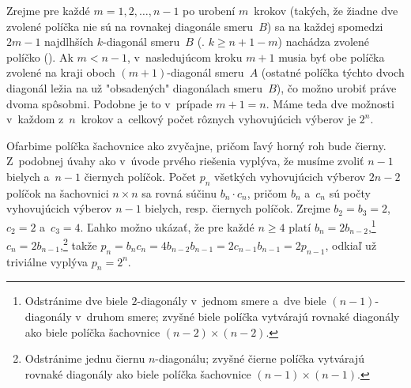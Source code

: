 {Zrejme pre každé $m=1,2,\dots,n-1$ po urobení $m$~krokov (takých, že žiadne dve zvolené políčka nie sú na rovnakej diagonále smeru~$B$) sa na každej spomedzi $2m-1$ najdlhších $k$-diagonál smeru~$B$ (\tj. $k\ge n+1-m$) nachádza zvolené políčko (\obr). Ak $m<n-1$, v~nasledujúcom kroku $m+1$ musia byť obe políčka zvolené na kraji oboch $(m+1)$-diagonál smeru~$A$ (ostatné políčka týchto dvoch diagonál ležia na už "obsadených" diagonálach smeru~$B$), čo možno urobiť práve dvoma spôsobmi. Podobne je to v~prípade $m+1=n$. Máme teda dve možnosti v~každom z~$n$~krokov a~celkový počet rôznych vyhovujúcich výberov je $2^n$.


\ineriesenie
{}
Ofarbime políčka šachovnice ako zvyčajne, pričom ľavý horný roh bude čierny. Z~podobnej úvahy ako v~úvode prvého riešenia vyplýva, že musíme zvoliť $n-1$ bielych a~$n-1$ čiernych políčok. Počet $p_n$ všetkých vyhovujúcich výberov $2n-2$ políčok na šachovnici $n\times n$ sa rovná súčinu $b_n\cdot c_n$, pričom $b_n$ a~$c_n$ sú počty vyhovujúcich výberov $n-1$ bielych, resp. čiernych políčok. Zrejme $b_2=b_3=2$, $c_2=2$ a~$c_3=4$. Ľahko možno ukázať, že pre každé $n\ge4$ platí $b_n=2b_{n-2}$,\footnote{Odstránime dve biele $2$-diagonály v~jednom smere a~dve biele $(n-1)$-diagonály v~druhom smere; zvyšné biele políčka vytvárajú rovnaké diagonály ako biele políčka šachovnice $(n-2)\times(n-2)$.} $c_n=2b_{n-1}$,\footnote{Odstránime jednu čiernu $n$-diagonálu; zvyšné čierne políčka vytvárajú rovnaké diagonály ako biele políčka šachovnice $(n-1)\times(n-1)$.} takže $p_n=b_nc_n=4b_{n-2}b_{n-1}=2c_{n-1}b_{n-1}=2p_{n-1}$, odkiaľ už triviálne vyplýva $p_n=2^n$.
}

